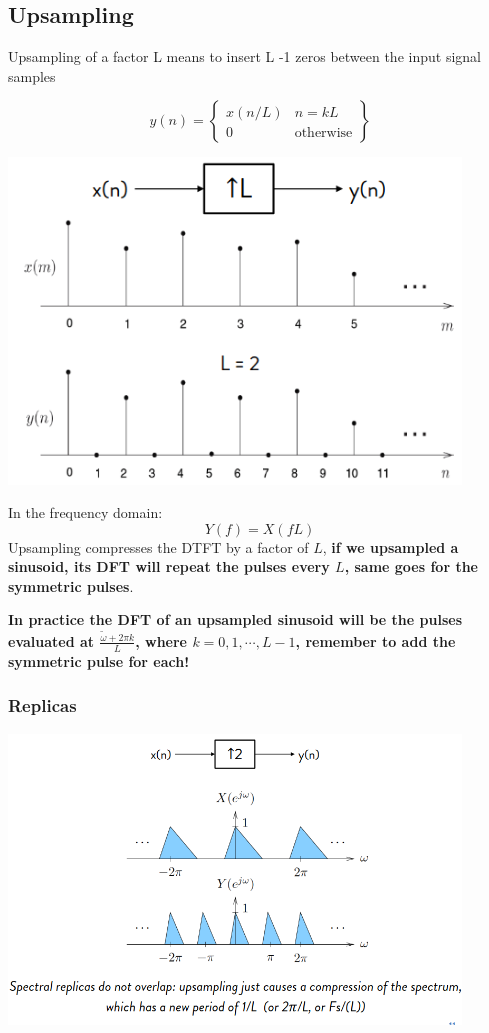 \subsection{Upsampling}
    Upsampling of a factor L means to insert L -1 zeros between the input signal samples
    \begin{LARGE}
        $$
        y(n)=\begin{Bmatrix}
            x(n/L) & n=kL\\
            0 & \text{otherwise}
        \end{Bmatrix}
        $$    
    \end{LARGE}
    \begin{center}
        \includegraphics[width=0.9\textwidth]{images/upsampling.png}
    \end{center}
    In the frequency domain:
    $$
    Y(f)=X(fL)
    $$
    Upsampling compresses the DTFT by a factor of $L$, \textbf{if we upsampled a sinusoid, its DFT will repeat the pulses every $L$, same goes for the symmetric pulses}.

    \textbf{In practice the DFT of an upsampled sinusoid will be the pulses evaluated at $\frac{\tilde{\omega}+2\pi k}{L}$, where $k=0,1,\cdots,L-1$, remember to add the symmetric pulse for each!}

    \subsubsection{Replicas}
    \begin{center}
        \includegraphics[width=0.9\textwidth]{images/upsampling_replica.png}
    \end{center}

